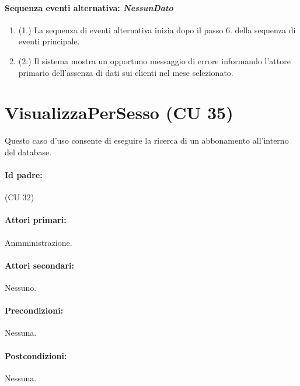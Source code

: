 \documentclass{article}
\begin{document}
		\paragraph{Sequenza eventi alternativa: \textit{NessunDato}}
	\begin{enumerate}	[leftmargin=28pt]
			\item  (1.) La sequenza di eventi alternativa inizia dopo il passo 6. della sequenza di eventi principale.
			\item  (2.) Il sistema mostra un opportuno messaggio di errore informando l'attore primario dell'assenza di dati sui clienti nel mese selezionato.
		\end{enumerate}




	
	
\newpage
\section*{VisualizzaPerSesso (CU 35)}
	
	Questo caso d'uso consente di eseguire la ricerca di un abbonamento all'interno del database.
	
	\paragraph{Id padre:} (CU 32)
	
	\paragraph{Attori primari:}Anmministrazione.
	
	\paragraph{Attori secondari:}Nessuno.
	
	\paragraph{Precondizioni:}Nessuna.
	
	\paragraph{Postcondizioni:}Nessuna.
\end{document}

